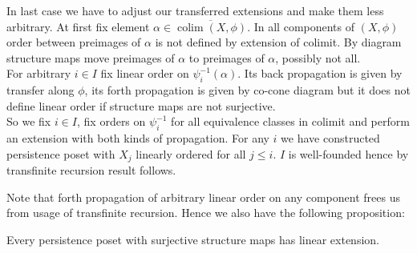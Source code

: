 \begin{pf}
  In last case we have to adjust our transferred extensions and make them less arbitrary. At first fix element $\alpha \in \overline{\operatorname{colim}(X, \phi)}$. In all components of $(X,\phi)$ order between preimages of $\alpha$ is not defined by extension of colimit. By diagram structure maps move preimages of $\alpha$ to preimages of $\alpha$, possibly not all.\\

  For arbitrary $i \in I$ fix linear order on $\psi_i^{-1}(\alpha)$. Its back propagation is given by transfer along $\phi$, its forth propagation is given by co-cone diagram but it does not define linear order if structure maps are not surjective.\\

  So we fix $i \in I$, fix orders on $\psi_i^{-1}$ for all equivalence classes in colimit and perform an extension with both kinds of propagation. For any $i$ we have constructed persistence poset with $X_j$ linearly ordered for all $j \leq i$. $I$ is well-founded hence by transfinite recursion result follows.
\end{pf}

Note that forth propagation of arbitrary linear order on any component frees us from usage of transfinite recursion. Hence we also have the following proposition:\\

\begin{proposition}
  Every persistence poset with surjective structure maps has linear extension.
\end{proposition}

